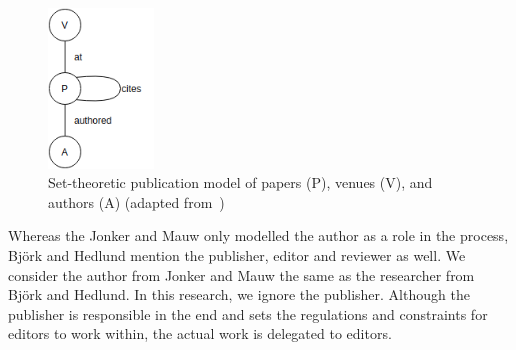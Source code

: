 \documentclass{ou-report}
\begin{document}
\begin{figure}
    \centering
    \includegraphics[width=0.25\textwidth]{images/jm2017_undiced_pub_view.drawio.png}
    \vspace{-20pt}
    \caption{Set-theoretic publication model of papers (P), venues (V), and 
authors (A) (adapted from~\cite{JM2017})}
    \label{fig:jm2017_induced_pub_model}
    
\end{figure}




Whereas the Jonker and Mauw only modelled the author as a role in the process, 
Bj\"ork and Hedlund mention the publisher, editor and reviewer as well. 
We consider the author from Jonker and Mauw the same as the researcher from 
Bj\"ork and Hedlund. In this research, we ignore the publisher. Although the 
publisher is responsible in the end and sets the regulations and constraints for 
editors to work within, the actual work is delegated to editors.

\end{document}
